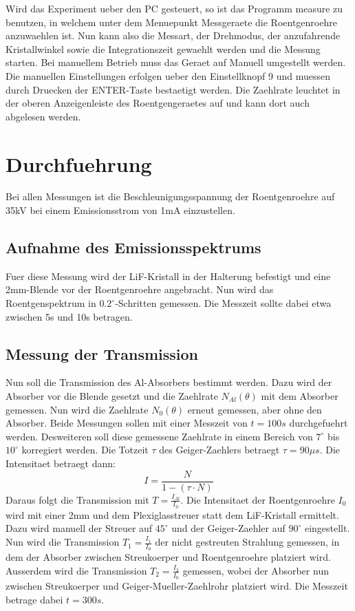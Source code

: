 \noindent Wird das Experiment ueber den PC gesteuert, so ist das Programm measure zu benutzen, in welchem unter dem Menuepunkt Messgeraete die Roentgenroehre anzuwaehlen ist. Nun kann also die Messart, der Drehmodus, der anzufahrende
Kristallwinkel sowie die Integrationszeit gewaehlt werden und die Messung starten. Bei
manuellem Betrieb muss das Geraet auf Manuell umgestellt werden. Die manuellen Einstellungen erfolgen ueber den Einstellknopf
9 und muessen durch Druecken der ENTER-Taste bestaetigt werden. Die Zaehlrate leuchtet in der oberen Anzeigenleiste des Roentgengeraetes auf und kann dort auch abgelesen werden.
\newpage \section{Durchfuehrung}
Bei allen Messungen ist die Beschleunigungsspannung der Roentgenroehre auf 35kV bei einem Emissionsstrom von 1mA einzustellen.
\subsection{Aufnahme des Emissionsspektrums}
Fuer diese Messung wird der LiF-Kristall in der Halterung befestigt und eine 2mm-Blende vor der Roentgenroehre angebracht. Nun wird das Roentgenspektrum in $0.2^{\circ}$-Schritten gemessen. Die Messzeit sollte dabei etwa zwischen 5s und 10s betragen.
\subsection{Messung der Transmission}
Nun soll die Transmission des Al-Absorbers bestimmt werden. Dazu wird der Absorber vor die Blende gesetzt und die Zaehlrate $N_{Al}(\theta)$ mit dem Absorber gemessen. Nun wird die Zaehlrate $N_0(\theta)$ erneut gemessen, aber ohne den Absorber. Beide Messungen sollen mit einer Messzeit von $t=100s$ durchgefuehrt werden. Desweiteren soll diese gemessene Zaehlrate in einem Bereich von $7^{\circ}$ bis $10^{\circ}$ korregiert werden. Die Totzeit $\tau$ des Geiger-Zaehlers betraegt $\tau=90\mu s$. Die Intensitaet betraegt dann:
\begin{equation}\label{tot}
    I=\frac{N}{1-(\tau\cdot N)}
\end{equation}
Daraus folgt die Transmission mit $T=\frac{I_{Al}}{I_0}$.
Die Intensitaet der Roentgenroehre $I_0$ wird mit einer 2mm und dem Plexiglasstreuer statt dem LiF-Kristall ermittelt. Dazu wird manuell der Streuer auf $45^{\circ}$ und der Geiger-Zaehler auf $90^{\circ}$ eingestellt.
Nun wird die Transmission $T_1=\frac{I_1}{I_0}$ der nicht gestreuten Strahlung gemessen, in dem der Absorber zwischen Streukoerper und Roentgenroehre platziert wird. Ausserdem wird die Transmission $T_2=\frac{I_2}{I_0}$ gemessen, wobei der Absorber nun zwischen Streukoerper und Geiger-Mueller-Zaehlrohr platziert wird. Die Messzeit betrage dabei $t=300s$.